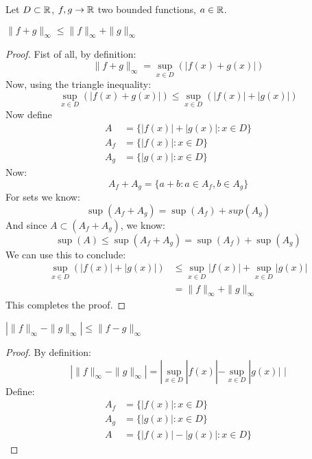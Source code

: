 \documentclass[week=10]{homework}
\begin{document}
\begin{questions}
\begin{parts}
			So $f_n(x_0) \to f^*$ pointwise $\forall x \in [0, \pi]$. 
			
			\part $f_n : [0,\infty) \to \reals$ with $f_n(x) = \frac{x}{n} \exp \left(- \frac{x}{n} \right)$
			
			Define 
			\[
				f^*(x) = 0 \quad \forall_{x \in [0,\infty)}
			\]
			Now:
			\[
				f_n(x) = \frac{x}{n} e^{-\frac{x}{n}} = \frac{\frac{x}{n}}{e^{\frac{x}{n}}} \to 0 \text{ as } n to \infty
			\]
			Therefore, $f_n(x) \to f^*(x)$ pointwise. 
			
		\end{parts}

		\question
		Let $D \subset \mathbb{R}$, $f, g \to \mathbb{R}$ two bounded functions, $a \in \mathbb{R}$. 
		
		\begin{toprove}
			$\|f+g\|_\infty \le \|f\|_\infty + \|g\|_\infty$
		\end{toprove}
		\begin{proof}
			Fist of all, by definition: 
			\[
				\| f + g \|_\infty = \sup_{x \in D} ( |f(x) + g(x)| )
			\]
			Now, using the triangle inequality:
			\[
				\sup_{x \in D} ( |f(x) + g(x)| ) \le \sup_{x \in D} ( |f(x)| + |g(x)| )
			\]
			Now define 
			\begin{align}
				A &= \{|f(x)| + |g(x)|:  x \in D \} \\
				A_f &= \{|f(x)|: x \in D \} \\
				A_g &= \{|g(x)|: x \in D \}
			\end{align}
			Now: 
			\[
				A_f + A_g = \{a + b : a \in A_f, b \in A_g \}
			\]
			For sets we know: 
			\[
				\sup(A_f + A_g) = \sup(A_f) + sup(A_g)
			\]
			And since $A \subset (A_f + A_g)$, we know:
			\[
				\sup(A) \le \sup(A_f + A_g) = \sup(A_f) + \sup(A_g)
			\]
			We can use this to conclude:
			\begin{align*}
				\sup_{x \in D} ( |f(x)| + |g(x)| ) &\le \sup_{x \in D} |f(x)| + \sup_{x \in D} |g(x)| \\
				&= \|f \|_\infty + \| g \|_\infty
			\end{align*}
			This completes the proof. 
		\end{proof}
		
		\begin{toprove}
			$\left| \|f\|_\infty - \|g\|_\infty \right| \le \|f-g\|_\infty$
		\end{toprove}
		\begin{proof}
			By definition:
			\[
				\left| \|f\|_\infty - \|g\|_\infty \right| = | \sup_{x \in D} |f(x)| - \sup_{x \in D} |g(x)| \, \, |	
			\]
			Define:
			\begin{align*}
				A_f &= \{|f(x)| : x \in D \} \\
				A_g &= \{|g(x)| : x \in D \} \\
				A &= \{|f(x)| - |g(x)| : x \in D \}
			\end{align*}
			

\end{proof}
\end{questions}
\end{document}
